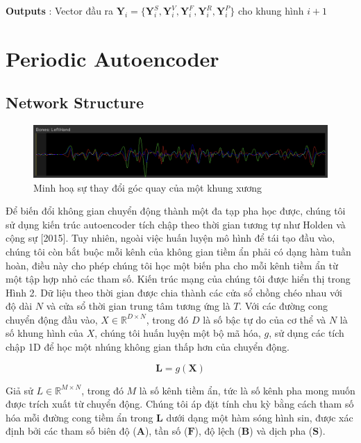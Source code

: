 \textbf{Outputs} : Vector đầu ra $\textbf{Y}_i = \{ \textbf{Y}^S_i, \textbf{Y}^V_i, \textbf{Y}^F_i, \textbf{Y}^R_i, \textbf{Y}^P_i \}$ cho khung hình $i+1$

\section{Periodic Autoencoder}
\label{PeriodicAutoencoder}
	
\subsection{Network Structure}

\begin{figure}
    \centering
    \includegraphics[width=\linewidth]{images/BoneRotationSeries.png}
    \caption{Minh hoạ sự thay đổi góc quay của một khung xương}
    \label{fig:BoneRotationSeries}
\end{figure}

Để biến đổi không gian chuyển động thành một đa tạp pha học được, chúng tôi sử dụng kiến trúc autoencoder tích chập theo thời gian tương tự như Holden và cộng sự [2015]. Tuy nhiên, ngoài việc huấn luyện mô hình để tái tạo đầu vào, chúng tôi còn bắt buộc mỗi kênh của không gian tiềm ẩn phải có dạng hàm tuần hoàn, điều này cho phép chúng tôi học một biến pha cho mỗi kênh tiềm ẩn từ một tập hợp nhỏ các tham số. Kiến trúc mạng của chúng tôi được hiển thị trong Hình 2. Dữ liệu theo thời gian được chia thành các cửa sổ chồng chéo nhau với độ dài $N$ và cửa sổ thời gian trung tâm tương ứng là $T$. Với các đường cong chuyển động đầu vào, $X \in \mathbb{R}^{D \times N}$, trong đó $D$ là số bậc tự do của cơ thể và $N$ là số khung hình của $X$, chúng tôi huấn luyện một bộ mã hóa, $g$, sử dụng các tích chập 1D để học một nhúng không gian thấp hơn của chuyển động.


\begin{equation}
	\label{eq:encoder}
	\mathbf{L} = g( \textbf{X} )
\end{equation}

Giả sử $L \in \mathbb{R}^{M \times N}$, trong đó $M$ là số kênh tiềm ẩn, tức là số kênh pha mong muốn được trích xuất từ chuyển động. Chúng tôi áp đặt tính chu kỳ bằng cách tham số hóa mỗi đường cong tiềm ẩn trong $\mathbf{L}$ dưới dạng một hàm sóng hình sin, được xác định bởi các tham số biên độ ($\mathbf{A}$), tần số ($\mathbf{F}$), độ lệch ($\mathbf{B}$) và dịch pha ($\mathbf{S}$).

